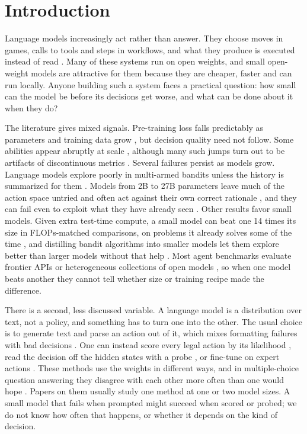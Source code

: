 \section{Introduction}
\label{sec:intro}

Language models increasingly act rather than answer. They choose moves in games, calls to tools and steps in workflows, and what they produce is executed instead of read \citep[e.g.][]{yao2023react,liu2024agentbench,paglieri2025balrog}. Many of these systems run on open weights, and small open-weight models are attractive for them because they are cheaper, faster and can run locally. Anyone building such a system faces a practical question: how small can the model be before its decisions get worse, and what can be done about it when they do?

The literature gives mixed signals. Pre-training loss falls predictably as parameters and training data grow \citep{hoffmann2022chinchilla}, but decision quality need not follow. Some abilities appear abruptly at scale \citep{wei2022emergent}, although many such jumps turn out to be artifacts of discontinuous metrics \citep{schaeffer2023mirage}. Several failures persist as models grow. Language models explore poorly in multi-armed bandits unless the history is summarized for them \citep{krishnamurthy2024explore}. Models from 2B to 27B parameters leave much of the action space untried and often act against their own correct rationale \citep{schmied2026greedy}, and they can fail even to exploit what they have already seen \citep{harris2026explore}. Other results favor small models. Given extra test-time compute, a small model can beat one 14 times its size in FLOPs-matched comparisons, on problems it already solves some of the time \citep{snell2025ttc}, and distilling bandit algorithms into smaller models let them explore better than larger models without that help \citep{nie2025evolve}. Most agent benchmarks evaluate frontier APIs or heterogeneous collections of open models \citep[e.g.][]{wu2024smartplay,liu2024agentbench,paglieri2025balrog,ruoss2025lmact,duan2024gtbench}, so when one model beats another they cannot tell whether size or training recipe made the difference.

There is a second, less discussed variable. A language model is a distribution over text, not a policy, and something has to turn one into the other. The usual choice is to generate text and parse an action out of it, which mixes formatting failures with bad decisions \citep{huang2022zeroshot,liu2024agentbench}. One can instead score every legal action by its likelihood \citep{carta2023glam,tan2024twosome}, read the decision off the hidden states with a probe \citep{belinkov2022probing,orgad2025know}, or fine-tune on expert actions \citep{chu2025sft}. These methods use the weights in different ways, and in multiple-choice question answering they disagree with each other more often than one would hope \citep{robinson2023mcsb,wang2024myanswerc}. Papers on them usually study one method at one or two model sizes. A small model that fails when prompted might succeed when scored or probed; we do not know how often that happens, or whether it depends on the kind of decision.

